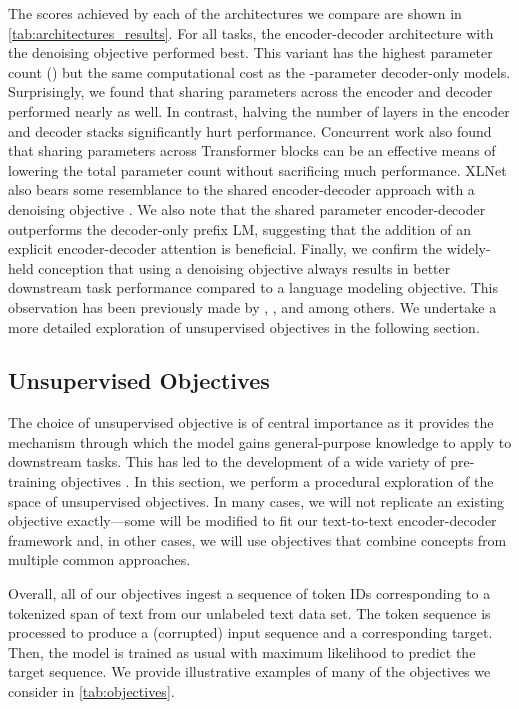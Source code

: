 \documentclass[twoside,11pt]{article}
\begin{document}
The scores achieved by each of the architectures we compare are shown in \cref{tab:architectures_results}.
For all tasks, the encoder-decoder architecture with the denoising objective performed best.
This variant has the highest parameter count () but the same computational cost as the -parameter decoder-only models.
Surprisingly, we found that sharing parameters across the encoder and decoder performed nearly as well.
In contrast, halving the number of layers in the encoder and decoder stacks significantly hurt performance.
Concurrent work \citep{lan2019albert} also found that sharing parameters across Transformer blocks can be an effective means of lowering the total parameter count without sacrificing much performance.
XLNet also bears some resemblance to the shared encoder-decoder approach with a denoising objective \citep{yang2019xlnet}.
We also note that the shared parameter encoder-decoder outperforms the decoder-only prefix LM, suggesting that the addition of an explicit encoder-decoder attention is beneficial.
Finally, we confirm the widely-held conception that using a denoising objective always results in better downstream task performance compared to a language modeling objective.
This observation has been previously made by \citet{devlin2018bert}, \citet{voita2019bottom}, and \citet{lample2019cross} among others.
We undertake a more detailed exploration of unsupervised objectives in the following section.

\subsection{Unsupervised Objectives}
\label{sec:objectives}

The choice of unsupervised objective is of central importance as it provides the mechanism through which the model gains general-purpose knowledge to apply to downstream tasks.
This has led to the development of a wide variety of pre-training objectives \citep{dai2015semi,ramachandran2016unsupervised,radford2018improving,devlin2018bert,yang2019xlnet,liu2019multi,wang2019can,song2019mass,dong2019unified,joshi2019spanbert}.
In this section, we perform a procedural exploration of the space of unsupervised objectives.
In many cases, we will not replicate an existing objective exactly---some will be modified to fit our text-to-text encoder-decoder framework and, in other cases, we will use objectives that combine concepts from multiple common approaches.

Overall, all of our objectives ingest a sequence of token IDs corresponding to a tokenized span of text from our unlabeled text data set.
The token sequence is processed to produce a (corrupted) input sequence and a corresponding target.
Then, the model is trained as usual with maximum likelihood to predict the target sequence.
We provide illustrative examples of many of the objectives we consider in \cref{tab:objectives}.
\end{document}
